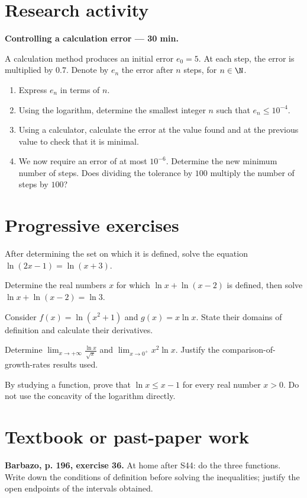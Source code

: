 \section{Research activity}\textbf{Controlling a calculation error --- 30 min.}\par A calculation method produces an initial error $e_0=5$. At each step, the error is multiplied by $\num{0,7}$. Denote by $e_n$ the error after $n$ steps, for $n\in\N$.
\begin{enumerate}\item Express $e_n$ in terms of $n$.
\item Using the logarithm, determine the smallest integer $n$ such that $e_n\le10^{-4}$.
\item Using a calculator, calculate the error at the value found and at the previous value to check that it is minimal.
\item We now require an error of at most $10^{-6}$. Determine the new minimum number of steps. Does dividing the tolerance by $100$ multiply the number of steps by $100$?\end{enumerate}

\mxnewpage
\section{Progressive exercises}

After determining the set on which it is defined, solve the equation $\ln(2x-1)=\ln(x+3)$.

Determine the real numbers $x$ for which $\ln x+\ln(x-2)$ is defined, then solve $\ln x+\ln(x-2)=\ln3$.

Consider $f(x)=\ln(x^2+1)$ and $g(x)=x\ln x$. State their domains of definition and calculate their derivatives.

Determine $\displaystyle\lim_{x\to+\infty}\frac{\ln x}{\sqrt x}$ and $\displaystyle\lim_{x\to0^+}x^2\ln x$. Justify the comparison-of-growth-rates results used.

By studying a function, prove that $\ln x\le x-1$ for every real number $x>0$. Do not use the concavity of the logarithm directly.

\section{Textbook or past-paper work}\textbf{Barbazo, p. 196, exercise 36.} At home after S44: do the three functions. Write down the conditions of definition before solving the inequalities; justify the open endpoints of the intervals obtained.

